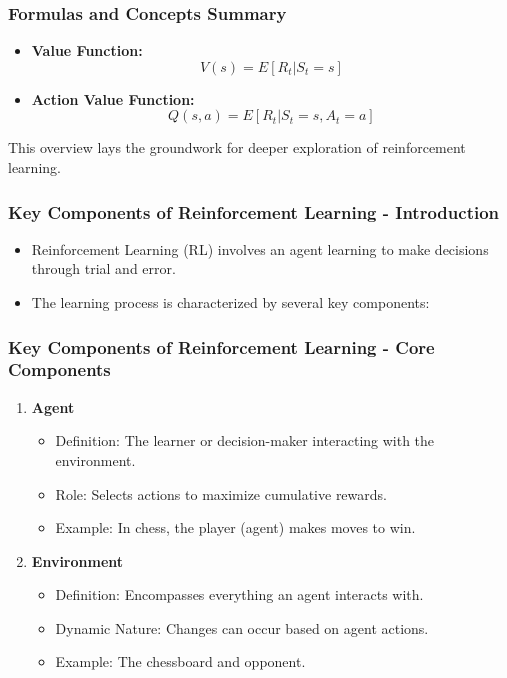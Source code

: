 \documentclass[aspectratio=169]{beamer}
\begin{document}
\begin{frame}[fragile]
    \frametitle{Formulas and Concepts Summary}
    \begin{itemize}
        \item \textbf{Value Function:}
        \begin{equation}
            V(s) = E[R_t | S_t = s]
        \end{equation}
        \item \textbf{Action Value Function:}
        \begin{equation}
            Q(s, a) = E[R_t | S_t = s, A_t = a]
        \end{equation}
    \end{itemize}
    This overview lays the groundwork for deeper exploration of reinforcement learning.
\end{frame}

\begin{frame}[fragile]
    \frametitle{Key Components of Reinforcement Learning - Introduction}
    \begin{itemize}
        \item Reinforcement Learning (RL) involves an agent learning to make decisions through trial and error.
        \item The learning process is characterized by several key components:
    \end{itemize}
\end{frame}

\begin{frame}[fragile]
    \frametitle{Key Components of Reinforcement Learning - Core Components}
    \begin{enumerate}
        \item \textbf{Agent}
        \begin{itemize}
            \item Definition: The learner or decision-maker interacting with the environment.
            \item Role: Selects actions to maximize cumulative rewards.
            \item Example: In chess, the player (agent) makes moves to win.
        \end{itemize}
        
        \item \textbf{Environment}
        \begin{itemize}
            \item Definition: Encompasses everything an agent interacts with.
            \item Dynamic Nature: Changes can occur based on agent actions.
            \item Example: The chessboard and opponent.
        \end{itemize}
    \end{enumerate}
\end{frame}
\end{document}

